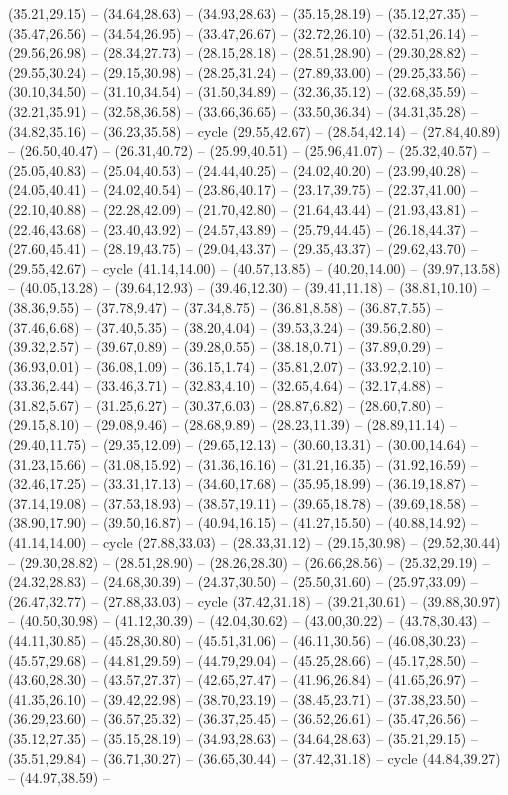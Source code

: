 {(35.21,29.15) -- (34.64,28.63) -- (34.93,28.63) -- (35.15,28.19) -- (35.12,27.35) -- (35.47,26.56) -- (34.54,26.95) -- (33.47,26.67) -- (32.72,26.10) -- (32.51,26.14) -- (29.56,26.98) -- (28.34,27.73) -- (28.15,28.18) -- (28.51,28.90) -- (29.30,28.82) -- (29.55,30.24) -- (29.15,30.98) -- (28.25,31.24) -- (27.89,33.00) -- (29.25,33.56) -- (30.10,34.50) -- (31.10,34.54) -- (31.50,34.89) -- (32.36,35.12) -- (32.68,35.59) -- (32.21,35.91) -- (32.58,36.58) -- (33.66,36.65) -- (33.50,36.34) -- (34.31,35.28) -- (34.82,35.16) -- (36.23,35.58) -- cycle (29.55,42.67) -- (28.54,42.14) -- (27.84,40.89) -- (26.50,40.47) -- (26.31,40.72) -- (25.99,40.51) -- (25.96,41.07) -- (25.32,40.57) -- (25.05,40.83) -- (25.04,40.53) -- (24.44,40.25) -- (24.02,40.20) -- (23.99,40.28) -- (24.05,40.41) -- (24.02,40.54) -- (23.86,40.17) -- (23.17,39.75) -- (22.37,41.00) -- (22.10,40.88) -- (22.28,42.09) -- (21.70,42.80) -- (21.64,43.44) -- (21.93,43.81) -- (22.46,43.68) -- (23.40,43.92) -- (24.57,43.89) -- (25.79,44.45) -- (26.18,44.37) -- (27.60,45.41) -- (28.19,43.75) -- (29.04,43.37) -- (29.35,43.37) -- (29.62,43.70) -- (29.55,42.67) -- cycle (41.14,14.00) -- (40.57,13.85) -- (40.20,14.00) -- (39.97,13.58) -- (40.05,13.28) -- (39.64,12.93) -- (39.46,12.30) -- (39.41,11.18) -- (38.81,10.10) -- (38.36,9.55) -- (37.78,9.47) -- (37.34,8.75) -- (36.81,8.58) -- (36.87,7.55) -- (37.46,6.68) -- (37.40,5.35) -- (38.20,4.04) -- (39.53,3.24) -- (39.56,2.80) -- (39.32,2.57) -- (39.67,0.89) -- (39.28,0.55) -- (38.18,0.71) -- (37.89,0.29) -- (36.93,0.01) -- (36.08,1.09) -- (36.15,1.74) -- (35.81,2.07) -- (33.92,2.10) -- (33.36,2.44) -- (33.46,3.71) -- (32.83,4.10) -- (32.65,4.64) -- (32.17,4.88) -- (31.82,5.67) -- (31.25,6.27) -- (30.37,6.03) -- (28.87,6.82) -- (28.60,7.80) -- (29.15,8.10) -- (29.08,9.46) -- (28.68,9.89) -- (28.23,11.39) -- (28.89,11.14) -- (29.40,11.75) -- (29.35,12.09) -- (29.65,12.13) -- (30.60,13.31) -- (30.00,14.64) -- (31.23,15.66) -- (31.08,15.92) -- (31.36,16.16) -- (31.21,16.35) -- (31.92,16.59) -- (32.46,17.25) -- (33.31,17.13) -- (34.60,17.68) -- (35.95,18.99) -- (36.19,18.87) -- (37.14,19.08) -- (37.53,18.93) -- (38.57,19.11) -- (39.65,18.78) -- (39.69,18.58) -- (38.90,17.90) -- (39.50,16.87) -- (40.94,16.15) -- (41.27,15.50) -- (40.88,14.92) -- (41.14,14.00) -- cycle (27.88,33.03) -- (28.33,31.12) -- (29.15,30.98) -- (29.52,30.44) -- (29.30,28.82) -- (28.51,28.90) -- (28.26,28.30) -- (26.66,28.56) -- (25.32,29.19) -- (24.32,28.83) -- (24.68,30.39) -- (24.37,30.50) -- (25.50,31.60) -- (25.97,33.09) -- (26.47,32.77) -- (27.88,33.03) -- cycle (37.42,31.18) -- (39.21,30.61) -- (39.88,30.97) -- (40.50,30.98) -- (41.12,30.39) -- (42.04,30.62) -- (43.00,30.22) -- (43.78,30.43) -- (44.11,30.85) -- (45.28,30.80) -- (45.51,31.06) -- (46.11,30.56) -- (46.08,30.23) -- (45.57,29.68) -- (44.81,29.59) -- (44.79,29.04) -- (45.25,28.66) -- (45.17,28.50) -- (43.60,28.30) -- (43.57,27.37) -- (42.65,27.47) -- (41.96,26.84) -- (41.65,26.97) -- (41.35,26.10) -- (39.42,22.98) -- (38.70,23.19) -- (38.45,23.71) -- (37.38,23.50) -- (36.29,23.60) -- (36.57,25.32) -- (36.37,25.45) -- (36.52,26.61) -- (35.47,26.56) -- (35.12,27.35) -- (35.15,28.19) -- (34.93,28.63) -- (34.64,28.63) -- (35.21,29.15) -- (35.51,29.84) -- (36.71,30.27) -- (36.65,30.44) -- (37.42,31.18) -- cycle (44.84,39.27) -- (44.97,38.59) -- }
